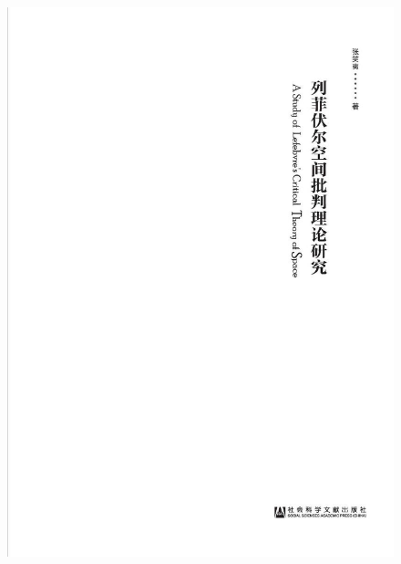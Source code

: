 \documentclass[UTF8, fontset = sourcesans, a4paper, oneside, zihao =
-4, scheme=chinese, no-math, space=true]{ctexbook}
\makeatletter
\def\maxwidth{\ifdim\Gin@nat@width>\linewidth\linewidth
\else\Gin@nat@width\fi}
\let\Oldincludegraphics\includegraphics
\renewcommand{\includegraphics}[1]{\Oldincludegraphics[width=\maxwidth]{#1}}
\makeatother
\begin{document}
\begin{figure}[!tbp]
  \centering
\includegraphics{images/00003.jpeg}
\end{figure}

\protect\hypertarget{part0003.html}{}{}
\end{document}
